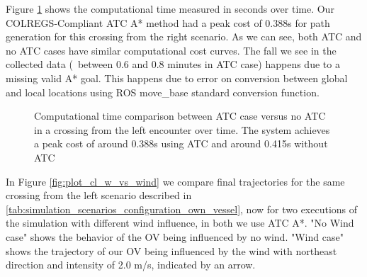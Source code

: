         Figure \ref{fig:plot_cl_w_vs_wo_CT} shows the computational time measured in seconds over time. Our \ac{COLREGS}-Compliant \ac{ATC} A* method had a peak cost of 0.388s for path generation for this crossing from the right scenario. As we can see, both \ac{ATC} and no \ac{ATC} cases have similar computational cost curves. The fall we see in the collected data (\eg{}~between 0.6 and 0.8 minutes in ATC case) happens due to a missing valid A* goal. This happens due to error on conversion between global and local locations using ROS move\_base standard conversion function.

        \begin{figure}[H]
            \centering
                
                \caption{Computational time comparison between \ac{ATC} case versus no \ac{ATC} in a crossing from the left encounter over time. The system achieves a peak cost of around 0.388s using \ac{ATC} and around 0.415s without \ac{ATC}}
                \label{fig:plot_cl_w_vs_wo_CT}
        \end{figure}
        
        
        In Figure \ref{fig:plot_cl_w_vs_wind} we compare final trajectories for the same crossing from the left scenario described in \ref{tab:simulation_scenarios_configuration_own_vessel}, now for two executions of the simulation with different wind influence, in both we use \ac{ATC} A*. "No Wind case" shows the behavior of the \ac{OV} being influenced by no wind. "Wind case" shows the trajectory of our \ac{OV} being influenced by the wind with northeast direction and intensity of 2.0 m/s, indicated by an arrow.
        

